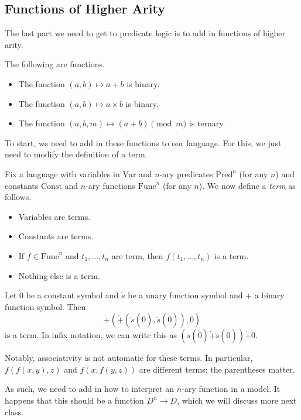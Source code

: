 \documentclass[../notes.tex]{subfiles}
\begin{document}
\subsection{Functions of Higher Arity}
The last part we need to get to predicate logic is to add in functions of higher arity.
\begin{example}
	The following are functions.
	\begin{itemize}
		\item The function $(a,b)\mapsto a+b$ is binary.
		\item The function $(a,b)\mapsto a\times b$ is binary.
		\item The function $(a,b,m)\mapsto (a+b)\pmod m$ is ternary.
	\end{itemize}
\end{example}
To start, we need to add in these functions to our language. For this, we just need to modify the definition of a term.
\begin{definition}[Term]
	Fix a language with variables in $\mathrm{Var}$ and $n$-ary predicates $\mathrm{Pred}^n$ (for any $n$) and constants $\mathrm{Const}$ and $n$-ary functions $\mathrm{Func}^n$ (for any $n$). We now define a \textit{term} as follows.
	\begin{itemize}
		\item Variables are terms.
		\item Constants are terms.
		\item If $f\in\mathrm{Func}^n$ and $t_1,\ldots,t_n$ are term, then $f(t_1,\ldots,t_n)$ is a term.
		\item Nothing else is a term.
	\end{itemize}
\end{definition}
\begin{example}
	Let $\dot0$ be a constant symbol and $\dot s$ be a unary function symbol and $\dot+$ a binary function symbol. Then
	\[\dot+(\dot+(\dot s(\dot0),\dot s(\dot0)),\dot0)\]
	is a term. In infix notation, we can write this as $(\dot s(\dot0)\dot+\dot s(\dot0))\dot+\dot0$.
\end{example}
\begin{remark}
	Notably, associativity is not automatic for these terms. In particular, $f(f(x,y),z)$ and $f(x,f(y,z))$ are different terms: the parentheses matter.
\end{remark}
As such, we need to add in how to interpret an $n$-ary function in a model. It happens that this should be a function $D^n\to D$, which we will discuss more next class.
\end{document}
